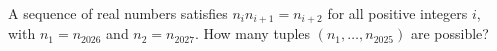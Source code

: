 A sequence of real numbers satisfies $n_in_{i+1}=n_{i+2}$ for all positive integers $i$, with $n_1=n_{2026}$ and $n_2=n_{2027}$. How many tuples $(n_1,\ldots,n_{2025})$ are possible?

